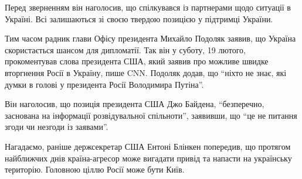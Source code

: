 Перед зверненням він наголосив, що спілкувався із партнерами щодо ситуації в
Україні. Всі залишаються зі своєю твердою позицією у підтримці України.

Тим часом радник глави Офісу президента Михайло Подоляк заявив, що Україна
скористається шансом для дипломатії. Так він у суботу, 19 лютого, прокоментував
слова президента США, який заявив про можливе швидке вторгнення Росії в
Україну, пише CNN.  Подоляк додав, що \enquote{ніхто не знає, які думки в
голові у президента Росії Володимира Путіна}.
 
Він наголосив, що позиція президента США Джо Байдена, \enquote{безперечно,
заснована на інформації розвідувальної спільноти}, заявивши, що \enquote{це не
питання згоди чи незгоди із заявами}.

Нагадаємо, раніше держсекретар США Ентоні Блінкен попередив, що протягом
найближчих днів країна-агресор може вигадати привід та напасти на українську
територію. Головною ціллю Росії може бути Київ.
